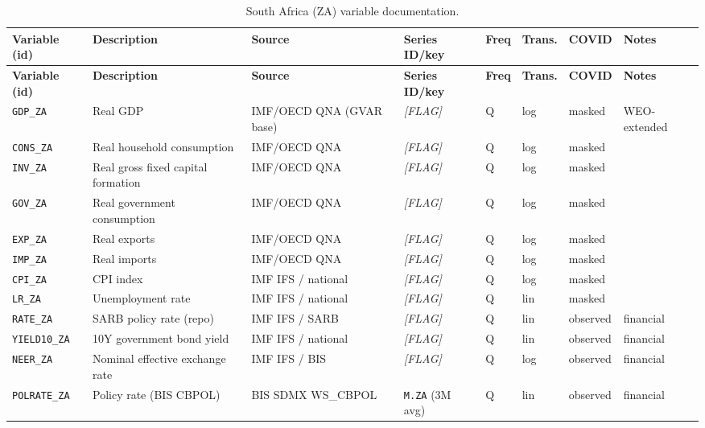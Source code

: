 {\footnotesize
\begin{longtable}{p{2.3cm}p{3.3cm}p{2.1cm}p{2.2cm}p{0.6cm}p{1.4cm}p{1.9cm}p{2.4cm}}
\caption{South Africa (ZA) variable documentation.}\label{tab:data:ZA}\\
\toprule
\textbf{Variable (id)} & \textbf{Description} & \textbf{Source} & \textbf{Series ID/key} & \textbf{Freq} & \textbf{Trans.} & \textbf{COVID} & \textbf{Notes} \\
\midrule
\endfirsthead
\toprule
\textbf{Variable (id)} & \textbf{Description} & \textbf{Source} & \textbf{Series ID/key} & \textbf{Freq} & \textbf{Trans.} & \textbf{COVID} & \textbf{Notes} \\
\midrule
\endhead
\bottomrule
\endfoot
\texttt{GDP\_ZA}    & Real GDP                           & IMF/OECD QNA (GVAR base) & \textit{[FLAG]} & Q & log & masked & WEO-extended \\
\texttt{CONS\_ZA}   & Real household consumption         & IMF/OECD QNA & \textit{[FLAG]} & Q & log & masked & \\
\texttt{INV\_ZA}    & Real gross fixed capital formation & IMF/OECD QNA & \textit{[FLAG]} & Q & log & masked & \\
\texttt{GOV\_ZA}    & Real government consumption        & IMF/OECD QNA & \textit{[FLAG]} & Q & log & masked & \\
\texttt{EXP\_ZA}    & Real exports                       & IMF/OECD QNA & \textit{[FLAG]} & Q & log & masked & \\
\texttt{IMP\_ZA}    & Real imports                       & IMF/OECD QNA & \textit{[FLAG]} & Q & log & masked & \\
\texttt{CPI\_ZA}    & CPI index                          & IMF IFS / national & \textit{[FLAG]} & Q & log & masked & \\
\texttt{LR\_ZA}     & Unemployment rate                  & IMF IFS / national & \textit{[FLAG]} & Q & lin & masked & \\
\texttt{RATE\_ZA}   & SARB policy rate (repo)            & IMF IFS / SARB & \textit{[FLAG]} & Q & lin & observed & financial \\
\texttt{YIELD10\_ZA}& 10Y government bond yield          & IMF IFS / national & \textit{[FLAG]} & Q & lin & observed & financial \\
\texttt{NEER\_ZA}   & Nominal effective exchange rate    & IMF IFS / BIS & \textit{[FLAG]} & Q & log & observed & financial \\
\texttt{POLRATE\_ZA}& Policy rate (BIS CBPOL)            & BIS SDMX WS\_CBPOL & \texttt{M.ZA} (3M avg) & Q & lin & observed & financial \\

\end{longtable}}
